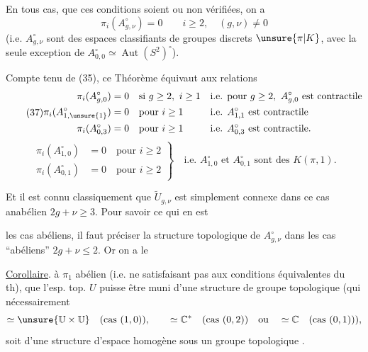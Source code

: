 En tous cas, que ces conditions soient ou non vérifiées, on a 
\[
\pi_i(A_{g,\nu}^{\circ})=0\qquad i\geq2,\quad(g,\nu)\ne0
\]
(i.e.  $A_{g,\nu}^{\circ}$ sont des espaces classifiants de groupes discrets $\unsure{\pi|K}$, avec la seule exception de $A_{0,0}^{\circ}\simeq\operatorname{Aut}(S^2)^{\circ}$).

Compte tenu de (35), ce Théorème équivaut aux relations
\[
\tag{37}
\begin{aligned}
\pi_i(A_{g,0}^{\circ})&=0\quad\text{si }g\geq2,\ i\geq1
&&\text{i.e. pour }g\geq2,\ A_{g,0}^{\circ}\text{ est contractile}\\
\pi_i(A_{1,\unsure{1}}^{\circ})&=0\quad\text{pour }i\geq1
&&\text{i.e. }A_{1,1}^{\circ}\text{ est contractile}\\
\pi_i(A_{0,3}^{\circ})&=0\quad\text{pour }i\geq1
&&\text{i.e. }A_{0,3}^{\circ}\text{ est contractile}.
\end{aligned}
\]
\[
\tag{38}
\left.\begin{aligned}
\pi_i(A_{1,0}^{\circ})&=0\quad\text{pour }i\geq2\\
\pi_i(A_{0,1}^{\circ})&=0\quad\text{pour }i\geq2
\end{aligned}\right\}
\quad\text{i.e. }A_{1,0}^{\circ}\text{ et }A_{0,1}^{\circ}\text{ sont des }K(\pi,1).
\]

Et il est connu classiquement que $\widetilde U_{g,\nu}$ est simplement connexe dans ce cas anabélien $2g+\nu\geq3$. Pour savoir ce qui en est

 les cas abéliens, il faut préciser la structure topologique de $A_{g,\nu}^{\circ}$ dans les  cas ``abéliens'' $2g+\nu\leq2$. Or on a le

\uline{Corollaire}.   à $\pi_1$ abélien (i.e. ne satisfaisant pas aux conditions équivalentes du th),  que l'esp. top. $U$   puisse être muni d'une structure de groupe topologique (qui nécessairement
\[
\simeq\unsure{\mathbb U\times\mathbb U}\quad\text{(cas }(1,0)\text{)},\qquad
\simeq\mathbb C^*\quad\text{(cas }(0,2)\text{)}\quad\text{ou}\quad
\simeq\mathbb C\quad\text{(cas }(0,1)\text{)}),
\]
soit d'une structure d'espace homogène sous un groupe topologique .

